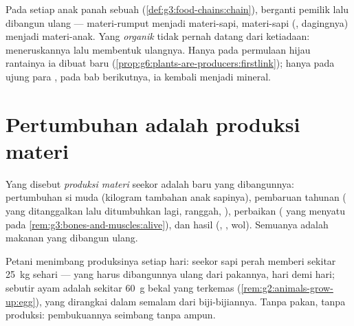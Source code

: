 \begin{remark}\label{rem:g6:matter-from-food:hands}
Pada setiap anak panah sebuah 
(\cref{def:g3:food-chains:chain}),  berganti pemilik lalu
dibangun ulang --- materi-rumput menjadi materi-sapi, materi-sapi
(, dagingnya) menjadi materi-anak. Yang \emph{organik} tidak
pernah datang dari ketiadaan:  meneruskannya lalu membentuk
ulangnya. Hanya pada permulaan hijau rantainya ia dibuat baru
(\cref{prop:g6:plants-are-producers:firstlink}); hanya pada ujung para
, pada bab berikutnya, ia kembali menjadi mineral.
\end{remark}

\section{Pertumbuhan adalah produksi materi}

\begin{definition}\label{def:g6:matter-from-food:production}
Yang disebut \emph{produksi materi} seekor
 adalah  baru yang dibangunnya: pertumbuhan si muda
(kilogram tambahan anak sapinya), pembaruan tahunan ( yang
ditanggalkan lalu ditumbuhkan lagi, ranggah, ), perbaikan
( yang menyatu pada \cref{rem:g3:bones-and-muscles:alive}), dan
hasil (, , wol). Semuanya adalah makanan yang dibangun ulang.
\end{definition}

\begin{example}\label{ex:g6:matter-from-food:weighing}
Petani menimbang produksinya setiap hari: seekor sapi perah memberi
sekitar \qty{25}{kg}  sehari ---  yang harus
dibangunnya ulang dari pakannya, hari demi hari; sebutir  ayam
adalah sekitar \qty{60}{g} bekal yang terkemas
(\cref{rem:g2:animals-grow-up:egg}), yang dirangkai dalam semalam dari
biji-bijiannya. Tanpa pakan, tanpa produksi: pembukuannya seimbang
tanpa ampun.
\end{example}

